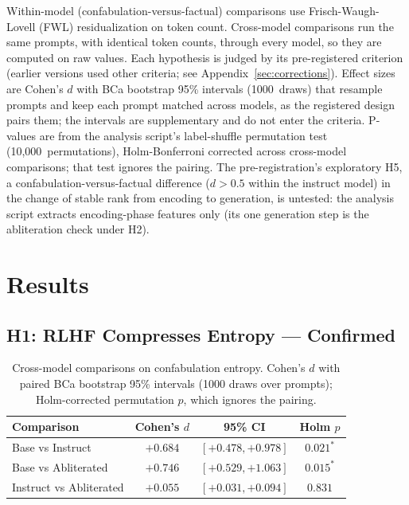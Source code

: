 \documentclass[11pt,a4paper]{article}
\begin{document}
Within-model (confabulation-versus-factual) comparisons use
Frisch-Waugh-Lovell (FWL) residualization on token count. Cross-model
comparisons run the same prompts, with identical token counts, through
every model, so they are computed on raw values. Each hypothesis is
judged by its pre-registered criterion (earlier versions used other
criteria; see Appendix~\ref{sec:corrections}). Effect sizes are Cohen's $d$
with BCa bootstrap 95\% intervals (1000~draws) that resample prompts
and keep each prompt matched across models, as the registered design
pairs them; the intervals are supplementary and do not enter the
criteria. P-values are from the analysis script's label-shuffle
permutation test (10,000~permutations), Holm-Bonferroni corrected
across cross-model comparisons; that test ignores the pairing.
The pre-registration's exploratory H5, a confabulation-versus-factual
difference ($d > 0.5$ within the instruct model) in the change of
stable rank from encoding to generation, is untested: the analysis
script extracts encoding-phase features only (its one generation step
is the abliteration check under H2).

\section{Results}
\label{sec:results}

\subsection{H1: RLHF Compresses Entropy --- Confirmed}

\begin{table}[ht]
\centering
\small
\caption{Cross-model comparisons on confabulation entropy. Cohen's
  $d$ with paired BCa bootstrap 95\% intervals (1000 draws over
  prompts); Holm-corrected permutation $p$, which ignores the pairing.}
\label{tab:crossmodel}
\begin{tabular}{lccc}
\toprule
\textbf{Comparison} & \textbf{Cohen's $d$} & \textbf{95\% CI} & \textbf{Holm $p$} \\
\midrule
Base vs Instruct & $+0.684$ & $[+0.478, +0.978]$ & $0.021^*$ \\
Base vs Abliterated & $+0.746$ & $[+0.529, +1.063]$ & $0.015^*$ \\
Instruct vs Abliterated & $+0.055$ & $[+0.031, +0.094]$ & $0.831$ \\
\bottomrule
\end{tabular}
\end{table}
\end{document}
